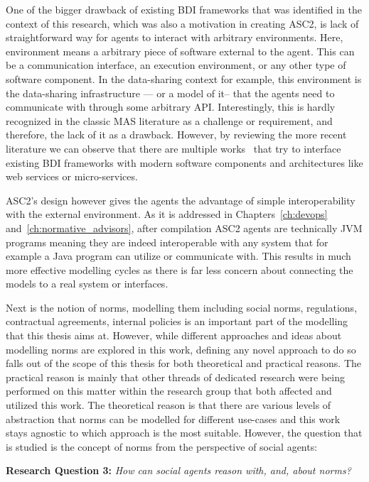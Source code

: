 One of the bigger drawback of existing BDI frameworks that was identified in the context of this research, which was also a motivation in creating ASC2, is lack of straightforward way for agents to interact with arbitrary environments. Here, environment means a arbitrary piece of software external to the agent. This can be a communication interface, an execution environment, or any other type of software component. In the data-sharing context for example, this environment is the data-sharing infrastructure --- or a model of it-- that the agents need to communicate with through some arbitrary API. Interestingly, this is hardly recognized in the classic MAS literature as a challenge or requirement, and therefore, the lack of it as a drawback. However, by reviewing the more recent literature we can observe that there are multiple works~\cite{Rafalimanana@2020,Collier2019,Mitrovic@2013} that try to interface existing BDI frameworks with modern software components and architectures like web services or micro-services.

ASC2's design however gives the agents the advantage of simple interoperability with the external environment. As it is addressed in Chapters~\ref{ch:devops} and~\ref{ch:normative_advisors}, after compilation ASC2 agents are technically JVM programs meaning they are indeed interoperable with any system that for example a Java program can utilize or communicate with. This results in much more effective modelling cycles as there is far less concern about connecting the models to a real system or interfaces.


Next is the notion of norms, modelling them including social norms, regulations, contractual agreements, internal policies is an important part of the modelling that this thesis aims at. However, while different approaches and ideas about modelling norms are explored in this work, defining any novel approach to do so falls out of the scope of this thesis for both theoretical and practical reasons. The practical reason is mainly that other threads of dedicated research were being performed on this matter within the research group that both affected and utilized this work. The theoretical reason is that there are various levels of abstraction that norms can be modelled for different use-cases and this work stays agnostic to which approach is the most suitable. However, the question that is studied is the concept of norms from the perspective of social agents:

\begin{displayquote}
\textbf{Research Question 3:} \textit{How can social agents reason with, and, about norms?}
\end{displayquote}

